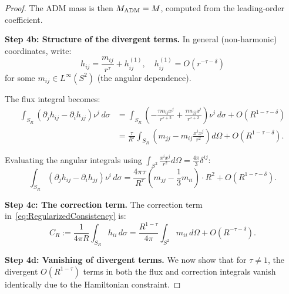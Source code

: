 \begin{proof}
The ADM mass is then $M_{\mathrm{ADM}} = M$, computed from the leading-order coefficient.

\textbf{Step 4b: Structure of the divergent terms.}
In general (non-harmonic) coordinates, write:
\begin{equation}
    h_{ij} = \frac{m_{ij}}{r^\tau} + h_{ij}^{(1)}, \quad h_{ij}^{(1)} = O(r^{-\tau - \delta})
\end{equation}
for some $m_{ij} \in L^\infty(S^2)$ (the angular dependence).

The flux integral becomes:
\begin{align}
    \int_{S_R} (\partial_j h_{ij} - \partial_i h_{jj}) \nu^i \, d\sigma 
    &= \int_{S_R} \left( -\frac{\tau m_{ij} x^j}{r^{\tau+2}} + \frac{\tau m_{jj} x^i}{r^{\tau+2}} \right) \nu^i \, d\sigma + O(R^{1-\tau-\delta}) \\
    &= \frac{\tau}{R^{\tau}} \int_{S_R} \left( m_{jj} - m_{ij} \frac{x^i x^j}{r^2} \right) d\Omega + O(R^{1-\tau-\delta}).
\end{align}

Evaluating the angular integrals using $\int_{S^2} \frac{x^i x^j}{r^2} d\Omega = \frac{4\pi}{3} \delta^{ij}$:
\begin{equation}
    \int_{S_R} (\partial_j h_{ij} - \partial_i h_{jj}) \nu^i \, d\sigma = \frac{4\pi \tau}{R^{\tau}} \left( m_{jj} - \frac{1}{3} m_{ii} \right) \cdot R^2 + O(R^{1-\tau-\delta}).
\end{equation}

\textbf{Step 4c: The correction term.}
The correction term in~\eqref{eq:RegularizedConsistency} is:
\begin{equation}
    C_R := \frac{1}{4\pi R} \int_{S_R} h_{ii} \, d\sigma = \frac{R^{1-\tau}}{4\pi} \int_{S^2} m_{ii} \, d\Omega + O(R^{-\tau-\delta}).
\end{equation}

\textbf{Step 4d: Vanishing of divergent terms.}
We now show that for $\tau \neq 1$, the divergent $O(R^{1-\tau})$ terms in both the flux and correction integrals vanish identically due to the Hamiltonian constraint.


\end{proof}

